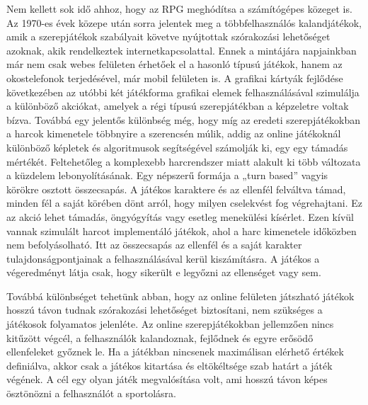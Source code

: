 Nem kellett sok idő ahhoz, hogy az RPG meghódítsa a számítógépes közeget is. 
Az 1970-es évek közepe után sorra jelentek meg a többfelhasználós kalandjátékok, amik a szerepjátékok szabályait követve nyújtottak szórakozási lehetőséget azoknak, akik rendelkeztek internetkapcsolattal. 
Ennek a mintájára napjainkban már nem csak webes felületen érhetőek el a hasonló típusú játékok, hanem az okostelefonok terjedésével, már mobil felületen is. 
A grafikai kártyák fejlődése következében az utóbbi két játékforma grafikai elemek felhasználásával szimulálja a különböző akciókat, amelyek a régi típusú szerepjátékban a képzeletre voltak bízva. 
Továbbá egy jelentős különbség még, hogy míg az eredeti szerepjátékokban a harcok kimenetele többnyire a szerencsén múlik, addig az online játékoknál különböző képletek és algoritmusok segítségével számolják ki, egy egy támadás mértékét. 
Feltehetőleg a komplexebb harcrendszer miatt alakult ki több változata a küzdelem lebonyolításának. 
Egy népszerű formája a „turn based” vagyis körökre osztott összecsapás. 
A játékos karaktere és az ellenfél felváltva támad, minden fél a saját körében dönt arról, hogy milyen cselekvést fog végrehajtani. 
Ez az akció lehet támadás, öngyógyítás vagy esetleg menekülési kísérlet. 
Ezen kívül vannak szimulált harcot implementáló játékok, ahol a harc kimenetele időközben nem befolyásolható.
Itt az összecsapás az ellenfél és a saját karakter tulajdonságpontjainak a felhasználásával kerül kiszámításra. 
A játékos a végeredményt látja csak, hogy sikerült e legyőzni az ellenséget vagy sem. 

Továbbá különbséget tehetünk abban, hogy az online felületen játszható játékok hosszú távon tudnak szórakozási lehetőséget biztosítani, nem szükséges a játékosok folyamatos jelenléte. 
Az online szerepjátékokban jellemzően nincs kitűzött végcél, a felhasználók kalandoznak, fejlődnek és egyre erősödő ellenfeleket győznek le. 
Ha a játékban nincsenek maximálisan elérhető értékek definiálva, akkor  csak a játékos kitartása és eltökéltsége szab határt a játék végének. 
A cél egy olyan játék megvalósítása volt, ami hosszú távon képes ösztönözni a felhasználót a sportolásra.

\newpage







